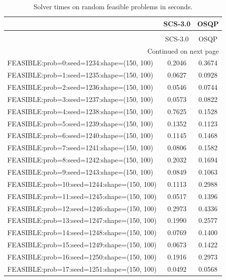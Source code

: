 \begin{longtable}{lcc}
\caption{Solver times on random feasible problems in seconds.}
\label{t-random feasible-results}\\
\toprule
{} &  SCS-3.0 &   OSQP \\
\midrule
\endfirsthead
\caption[]{Solver times on random feasible problems in seconds.} \\
\toprule
{} &  SCS-3.0 &   OSQP \\
\midrule
\endhead
\midrule
\multicolumn{3}{r}{{Continued on next page}} \\
\midrule
\endfoot

\bottomrule
\endlastfoot
FEASIBLE:prob=0:seed=1234:shape=(150, 100)   &   0.2046 & 0.3674 \\
FEASIBLE:prob=1:seed=1235:shape=(150, 100)   &   0.0627 & 0.0928 \\
FEASIBLE:prob=2:seed=1236:shape=(150, 100)   &   0.0546 & 0.0744 \\
FEASIBLE:prob=3:seed=1237:shape=(150, 100)   &   0.0573 & 0.0822 \\
FEASIBLE:prob=4:seed=1238:shape=(150, 100)   &   0.7625 & 0.1528 \\
FEASIBLE:prob=5:seed=1239:shape=(150, 100)   &   0.1352 & 0.1123 \\
FEASIBLE:prob=6:seed=1240:shape=(150, 100)   &   0.1145 & 0.1468 \\
FEASIBLE:prob=7:seed=1241:shape=(150, 100)   &   0.0806 & 0.1582 \\
FEASIBLE:prob=8:seed=1242:shape=(150, 100)   &   0.2032 & 0.1694 \\
FEASIBLE:prob=9:seed=1243:shape=(150, 100)   &   0.0849 & 0.1063 \\
FEASIBLE:prob=10:seed=1244:shape=(150, 100)  &   0.1113 & 0.2988 \\
FEASIBLE:prob=11:seed=1245:shape=(150, 100)  &   0.0517 & 0.1396 \\
FEASIBLE:prob=12:seed=1246:shape=(150, 100)  &   0.2973 & 0.4336 \\
FEASIBLE:prob=13:seed=1247:shape=(150, 100)  &   0.1990 & 0.2577 \\
FEASIBLE:prob=14:seed=1248:shape=(150, 100)  &   0.0769 & 0.1400 \\
FEASIBLE:prob=15:seed=1249:shape=(150, 100)  &   0.0673 & 0.1422 \\
FEASIBLE:prob=16:seed=1250:shape=(150, 100)  &   0.1916 & 0.2973 \\
FEASIBLE:prob=17:seed=1251:shape=(150, 100)  &   0.0492 & 0.0568 \\

\end{longtable}
